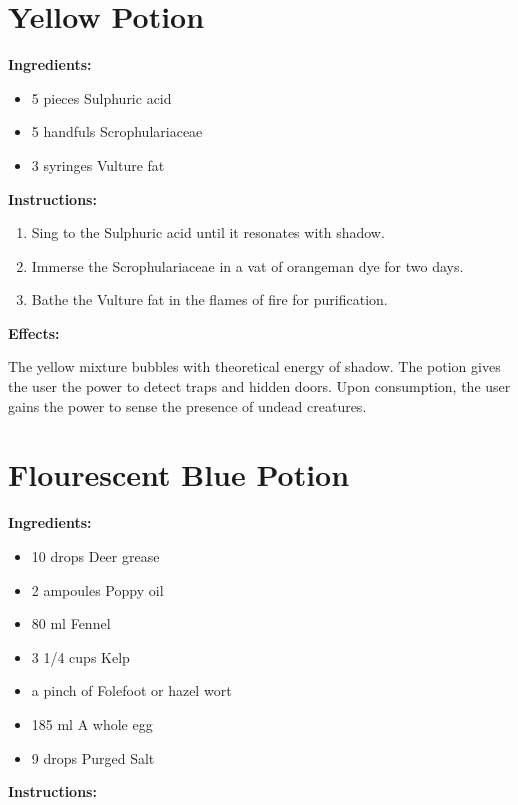 \documentclass{article}
\begin{document}
\newpage
\section*{Yellow Potion}

\textbf{Ingredients:}

\begin{itemize}
  \item 5 pieces Sulphuric acid
  \item 5 handfuls Scrophulariaceae
  \item 3 syringes Vulture fat
\end{itemize}

\textbf{Instructions:}

\begin{enumerate}
  \item Sing to the Sulphuric acid until it resonates with shadow.
  \item Immerse the Scrophulariaceae in a vat of orangeman dye for two days.
  \item Bathe the Vulture fat in the flames of fire for purification.
\end{enumerate}

\textbf{Effects:}

The yellow mixture bubbles with theoretical energy of shadow. The potion gives the user the power to detect traps and hidden doors. Upon consumption, the user gains the power to sense the presence of undead creatures.

\newpage
\section*{Flourescent Blue Potion}

\textbf{Ingredients:}

\begin{itemize}
  \item 10 drops Deer grease
  \item 2 ampoules Poppy oil
  \item 80 ml Fennel
  \item 3 1/4 cups Kelp
  \item a pinch of Folefoot or hazel wort
  \item 185 ml A whole egg
  \item 9 drops Purged Salt
\end{itemize}

\textbf{Instructions:}
\end{document}
